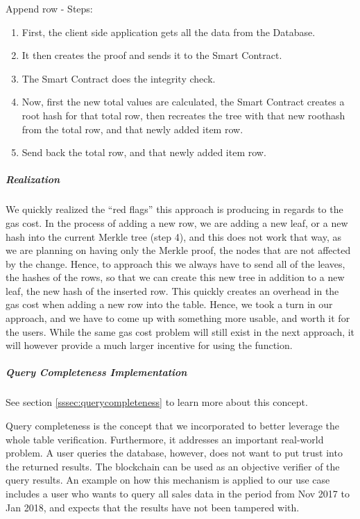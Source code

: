 Append row - Steps:
\begin{enumerate}
\item First, the client side application gets all the data from the Database.
\item It then creates the proof and sends it to the Smart Contract.
\item The Smart Contract does the integrity check.
\item Now, first the new total values are calculated, the Smart Contract creates a root hash for that total row, then recreates the tree with that new roothash from the total row, and that newly added item row.
\item Send back the total row, and that newly added item row.
\end{enumerate}

\subparagraph{Realization}

We quickly realized the “red flags” this approach is producing in regards to the gas cost. In the process of adding a new row, we are adding a new leaf, or a new hash into the current Merkle tree (step 4), and this does not work that way, as we are planning on having only the Merkle proof, the nodes that are not affected by the change. Hence, to approach this we always have to send all of the leaves, the hashes of the rows, so that we can create this new tree in addition to a new leaf, the new hash of the inserted row. This quickly creates an overhead in the gas cost when adding a new row into the table. Hence, we took a turn in our approach, and we have to come up with something more usable, and worth it for the users. While the same gas cost problem will still exist in the next approach, it will however provide a much larger incentive for using the function.

\subparagraph{Query Completeness Implementation}

See section \ref{sssec:querycompleteness} to learn more about this concept.

Query completeness is the concept that we incorporated to better leverage the whole table verification. Furthermore, it addresses an important real-world problem. A user queries the database, however, does not want to put trust into the returned results. The blockchain can be used as an objective verifier of the query results. An example on how this mechanism is applied to our use case includes a user who wants to query all sales data in the period from Nov 2017 to Jan 2018, and expects that the results have not been tampered with.

